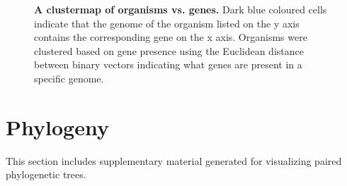 \documentclass{article}
\begin{document}
\begin{figure}[H]
\centering
{}
\caption{\textbf{A clustermap of organisms vs. genes.} Dark blue coloured cells indicate that the genome of the organism listed on the y axis contains the corresponding gene on the x axis. Organisms were clustered based on gene presence using the Euclidean distance between binary vectors indicating what genes are present in a specific genome.}
\label{sup_fig_3}
\end{figure}

\newpage
\section{Phylogeny}
This section includes supplementary material generated for visualizing paired phylogenetic trees. 
\end{document}

